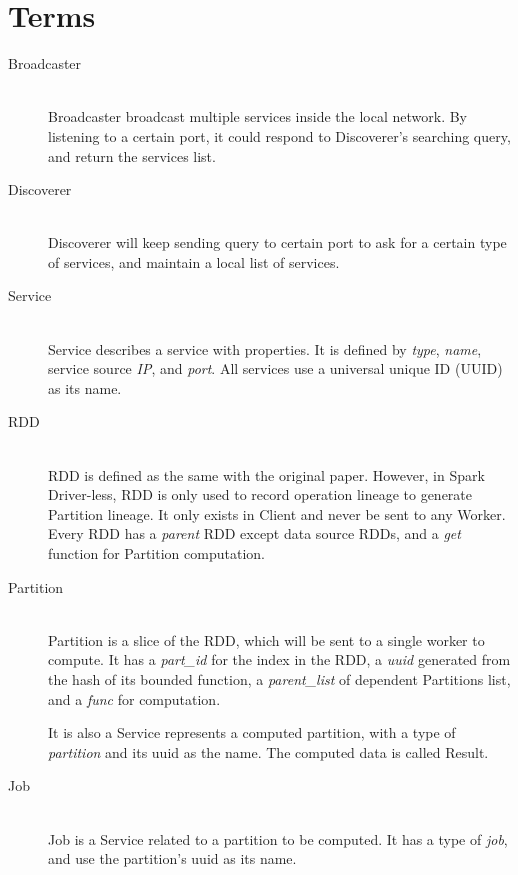 
\section{Terms} %
\label{sec:terms}


\begin{description}
    \item[Broadcaster] \hfill \\
    Broadcaster broadcast multiple services inside the local network.
    By listening to a certain port, it could respond to Discoverer's searching query, and return the services list.

    \item[Discoverer] \hfill \\
    Discoverer will keep sending query to certain port to ask for a certain type of services,
    and maintain a local list of services.

    \item[Service] \hfill \\
    Service describes a service with properties.
    It is defined by \emph{type}, \emph{name}, service source \emph{IP}, and \emph{port}.
    All services use a universal unique ID (UUID) as its name.

    \item[RDD] \hfill \\
    RDD is defined as the same with the original paper.
    However, in Spark Driver-less, RDD is only used to record operation lineage to generate Partition lineage.
    It only exists in Client and never be sent to any Worker.
    Every RDD has a \emph{parent} RDD except data source RDDs, and a \emph{get} function for Partition computation.

    \item[Partition] \hfill \\
    Partition is a slice of the RDD, which will be sent to a single worker to compute.
    It has a \emph{part\_id} for the index in the RDD,
    a \emph{uuid} generated from the hash of its bounded function,
    a \emph{parent\_list} of dependent Partitions list,
    and a \emph{func} for computation.

    It is also a Service represents a computed partition,
    with a type of \textit{partition} and its uuid as the name.
    The computed data is called Result.

    \item[Job] \hfill \\
    Job is a Service related to a partition to be computed.
    It has a type of \textit{job}, and use the partition's uuid as its name.


\end{description}
